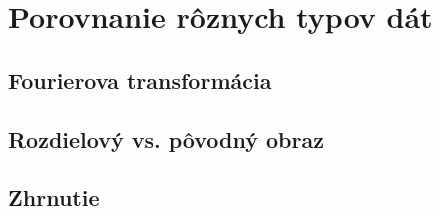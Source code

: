 \section{Porovnanie rôznych typov dát}

\subsection{Fourierova transformácia}

\todo 

\subsection{Rozdielový vs. pôvodný obraz}

\todo 

\subsection{Zhrnutie}

\todo 




